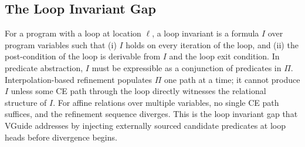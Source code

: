 \subsection{The Loop Invariant Gap}

For a program with a loop at location $\ell$, a loop invariant is a formula $I$ over
program variables such that (i) $I$ holds on every iteration of the loop, and (ii) the
post-condition of the loop is derivable from $I$ and the loop exit condition. In
predicate abstraction, $I$ must be expressible as a conjunction of predicates in $\Pi$.
Interpolation-based refinement populates $\Pi$ one path at a time; it cannot produce
$I$ unless some CE path through the loop directly witnesses the relational structure of
$I$. For affine relations over multiple variables, no single CE path suffices, and the
refinement sequence diverges. This is the loop invariant gap that VGuide addresses by
injecting externally sourced candidate predicates at loop heads before divergence begins.
